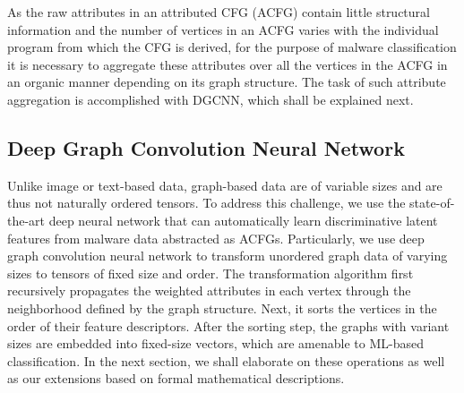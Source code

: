 As the raw attributes in an attributed CFG (ACFG) contain little structural information and the number of vertices in an ACFG varies with the individual program from which the CFG is derived, for the purpose of malware classification it is necessary to aggregate these attributes over all the vertices in the ACFG in an organic manner depending on its graph structure.
The task of such attribute aggregation is accomplished with DGCNN, which shall be explained next.




\subsection{Deep Graph Convolution Neural Network}\label{subsec:DGCNN}
Unlike image or text-based data, graph-based data are of variable sizes and are thus not naturally ordered tensors.
To address this challenge, we use the state-of-the-art deep neural network that can automatically learn discriminative latent features from malware data abstracted as ACFGs.
Particularly, we use deep graph convolution neural network to transform unordered graph data of varying sizes to tensors of fixed size and order.
The transformation algorithm first recursively propagates the weighted attributes in each vertex through the neighborhood defined by the graph structure.
Next, it sorts the vertices in the order of their feature descriptors.
After the sorting step, the graphs with variant sizes are embedded into fixed-size vectors, which are amenable to ML-based classification.
In the next section, we shall elaborate on these operations as well as our extensions based on formal mathematical descriptions.
